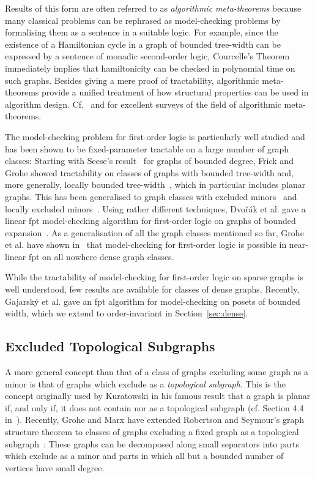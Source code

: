 \documentclass[12pt]{amsart}
\begin{document}
Results of this form are often referred to as \emph{algorithmic
  meta-theorems} because many classical problems can be rephrased as
model-checking problems by formalising them as a sentence  in
a suitable logic. For example, since the existence of a Hamiltonian
cycle in a graph  of bounded tree-width can be expressed by a
sentence  of monadic second-order logic, Courcelle's Theorem
immediately implies that hamiltonicity can be checked in polynomial
time on such graphs. Besides giving a mere proof of tractability,
algorithmic meta-theorems provide a unified treatment of how
structural properties can be used in algorithm
design. Cf.~\cite{Grohe07} and \cite{Kreutzer11} for excellent surveys
of the field of algorithmic meta-theorems.

The model-checking problem for first-order logic is particularly well
studied and has been shown to be fixed-parameter tractable on a large
number of graph classes: Starting with Seese's result~\cite{Seese96}
for graphs of bounded degree, Frick and Grohe showed tractability on
classes of graphs with bounded tree-width and, more generally, locally
bounded tree-width~\cite{FrickGro01}, which in particular includes
planar graphs. This has been generalised to graph classes with
excluded minors~\cite{FlumG01} and locally excluded
minors~\cite{DawarGroKre07}. Using rather different techniques, {Dvo\v
  r\'ak} et al. gave a linear fpt model-checking algorithm for
first-order logic on graphs of bounded
expansion~\cite{DvorakKT13}. As a generalisation of all the
graph classes mentioned so far, Grohe et al. have shown
in~\cite{gks14} that model-checking for first-order logic is possible
in near-linear fpt on all nowhere dense graph classes.

While the tractability of model-checking for first-order logic on
sparse graphs is well understood, few results are available for
classes of dense graphs. Recently, Gajarský et al. gave an fpt
algorithm for  model-checking on posets of bounded width, which
we extend to order-invariant  in Section~\ref{sec:dense}.

\subsection*{Excluded Topological Subgraphs}

A more general concept than that of a class of graphs excluding some
graph  as a minor is that of graphs which exclude  as a
\emph{topological subgraph}. This is the concept originally used by
Kuratowski in his famous result that a graph is planar if, and only
if, it does not contain  nor  as a topological subgraph
(cf. Section 4.4 in~\cite{diestel}). Recently, Grohe and Marx have
extended Robertson and Seymour's graph structure theorem to classes of
graphs excluding a fixed graph  as a topological
subgraph~\cite{gromar12+}: These graphs can be decomposed along small
separators into parts which exclude  as a minor and parts in which
all but a bounded number of vertices have small degree.
\end{document}
